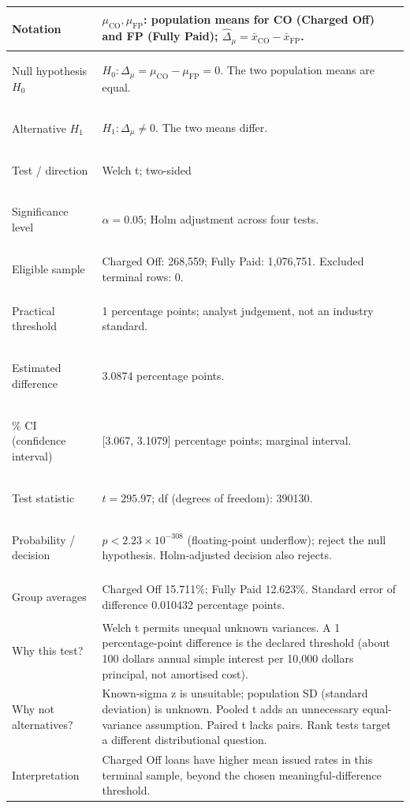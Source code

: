 \documentclass[10pt,a4paper,twocolumn]{article}
\begin{document}
\begin{tabularx}{\linewidth}{@{}>{\bfseries\raggedright\arraybackslash}p{.28\linewidth} X@{}}\toprule
Notation & \(\mu_{\mathrm{CO}},\mu_{\mathrm{FP}}\): population means for CO (Charged Off) and FP (Fully Paid); \(\widehat\Delta_\mu=\bar x_{\mathrm{CO}}-\bar x_{\mathrm{FP}}\).\\\midrule
Null hypothesis \(H_0\) & \(H_0:\Delta_\mu=\mu_{\mathrm{CO}}-\mu_{\mathrm{FP}}=0\). The two population means are equal.\\\midrule
Alternative \(H_1\) & \(H_1:\Delta_\mu\ne0\). The two means differ.\\\midrule
Test / direction & Welch t; two-sided\\\midrule
Significance level & \(\alpha=0.05\); Holm adjustment across four tests.\\\midrule
Eligible sample & Charged Off: 268,559; Fully Paid: 1,076,751. Excluded terminal rows: 0.\\\midrule
Practical threshold & 1 percentage points; analyst judgement, not an industry standard.\\\midrule
Estimated difference & 3.0874 percentage points.\\\midrule
95\% CI (confidence interval) & [3.067, 3.1079] percentage points; marginal interval.\\\midrule
Test statistic & \(t=295.97\); df (degrees of freedom): 390130.\\\midrule
Probability / decision & \(p<2.23\times10^{-308}\) (floating-point underflow); reject the null hypothesis. Holm-adjusted decision also rejects.\\\midrule
Group averages & Charged Off 15.711\%; Fully Paid 12.623\%. Standard error of difference 0.010432 percentage points.\\\midrule
Why this test? & Welch t permits unequal unknown variances. A 1 percentage-point difference is the declared threshold (about 100 dollars annual simple interest per 10,000 dollars principal, not amortised cost).\\\midrule
Why not alternatives? & Known-sigma z is unsuitable; population SD (standard deviation) is unknown. Pooled t adds an unnecessary equal-variance assumption. Paired t lacks pairs. Rank tests target a different distributional question.\\\midrule
Interpretation & Charged Off loans have higher mean issued rates in this terminal sample, beyond the chosen meaningful-difference threshold.\\\bottomrule\end{tabularx}
\end{document}
